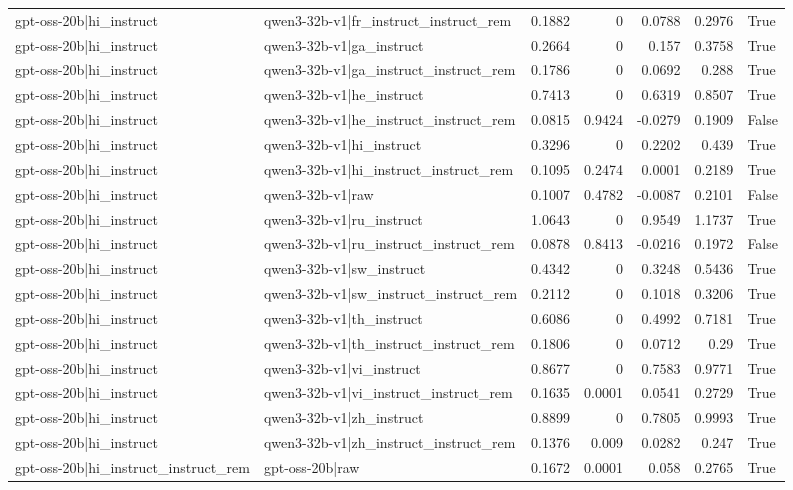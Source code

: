 \begin{table}
\begin{tabular}{l l r r r r l}
gpt-oss-20b|hi_instruct & qwen3-32b-v1|fr_instruct_instruct_rem & 0.1882 & 0 & 0.0788 & 0.2976 & True \\
gpt-oss-20b|hi_instruct & qwen3-32b-v1|ga_instruct & 0.2664 & 0 & 0.157 & 0.3758 & True \\
gpt-oss-20b|hi_instruct & qwen3-32b-v1|ga_instruct_instruct_rem & 0.1786 & 0 & 0.0692 & 0.288 & True \\
gpt-oss-20b|hi_instruct & qwen3-32b-v1|he_instruct & 0.7413 & 0 & 0.6319 & 0.8507 & True \\
gpt-oss-20b|hi_instruct & qwen3-32b-v1|he_instruct_instruct_rem & 0.0815 & 0.9424 & -0.0279 & 0.1909 & False \\
gpt-oss-20b|hi_instruct & qwen3-32b-v1|hi_instruct & 0.3296 & 0 & 0.2202 & 0.439 & True \\
gpt-oss-20b|hi_instruct & qwen3-32b-v1|hi_instruct_instruct_rem & 0.1095 & 0.2474 & 0.0001 & 0.2189 & True \\
gpt-oss-20b|hi_instruct & qwen3-32b-v1|raw & 0.1007 & 0.4782 & -0.0087 & 0.2101 & False \\
gpt-oss-20b|hi_instruct & qwen3-32b-v1|ru_instruct & 1.0643 & 0 & 0.9549 & 1.1737 & True \\
gpt-oss-20b|hi_instruct & qwen3-32b-v1|ru_instruct_instruct_rem & 0.0878 & 0.8413 & -0.0216 & 0.1972 & False \\
gpt-oss-20b|hi_instruct & qwen3-32b-v1|sw_instruct & 0.4342 & 0 & 0.3248 & 0.5436 & True \\
gpt-oss-20b|hi_instruct & qwen3-32b-v1|sw_instruct_instruct_rem & 0.2112 & 0 & 0.1018 & 0.3206 & True \\
gpt-oss-20b|hi_instruct & qwen3-32b-v1|th_instruct & 0.6086 & 0 & 0.4992 & 0.7181 & True \\
gpt-oss-20b|hi_instruct & qwen3-32b-v1|th_instruct_instruct_rem & 0.1806 & 0 & 0.0712 & 0.29 & True \\
gpt-oss-20b|hi_instruct & qwen3-32b-v1|vi_instruct & 0.8677 & 0 & 0.7583 & 0.9771 & True \\
gpt-oss-20b|hi_instruct & qwen3-32b-v1|vi_instruct_instruct_rem & 0.1635 & 0.0001 & 0.0541 & 0.2729 & True \\
gpt-oss-20b|hi_instruct & qwen3-32b-v1|zh_instruct & 0.8899 & 0 & 0.7805 & 0.9993 & True \\
gpt-oss-20b|hi_instruct & qwen3-32b-v1|zh_instruct_instruct_rem & 0.1376 & 0.009 & 0.0282 & 0.247 & True \\
gpt-oss-20b|hi_instruct_instruct_rem & gpt-oss-20b|raw & 0.1672 & 0.0001 & 0.058 & 0.2765 & True \\

\end{tabular}
\end{table}
